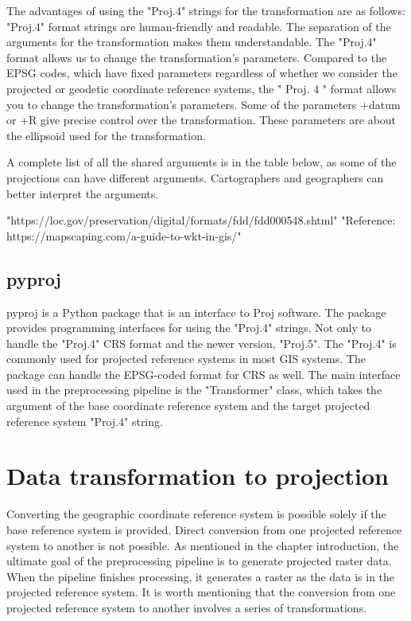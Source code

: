 The advantages of using the "Proj.4" strings for the transformation are as follows:
"Proj.4" format strings are human-friendly and readable. The separation of the arguments for the transformation makes them understandable.
The "Proj.4" format allows us to change the transformation's parameters. Compared to the EPSG codes, which have fixed parameters regardless of whether we consider the projected or geodetic coordinate reference systems, the " Proj. 4 " format allows you to change the transformation's parameters.
Some of the parameters +datum or +R give precise control over the transformation. These parameters are about the ellipsoid used for the transformation.

A complete list of all the shared arguments is in the table below, as some of the projections can have different arguments. Cartographers and geographers can better interpret the arguments.

"https://loc.gov/preservation/digital/formats/fdd/fdd000548.shtml"
"Reference: https://mapscaping.com/a-guide-to-wkt-in-gis/"
\subsection{pyproj}
pyproj is a Python package that is an interface to Proj software. The package provides programming interfaces for using the "Proj.4" strings. Not only to handle the "Proj.4"  CRS format and the newer version, "Proj.5". The "Proj.4" is commonly used for projected reference systems in most GIS systems. The package can handle the EPSG-coded format for CRS as well. The main interface used in the preprocessing pipeline is the "Transformer" class, which takes the argument of the base coordinate reference system and the target projected reference system "Proj.4" string.

\section{Data transformation to projection}
Converting the geographic coordinate reference system is possible solely if the base reference system is provided. Direct conversion from one projected reference system to another is not possible. As mentioned in the chapter introduction, the ultimate goal of the preprocessing pipeline is to generate projected raster data. When the pipeline finishes processing, it generates a raster as the data is in the projected reference system.
It is worth mentioning that the conversion from one projected reference system to another involves a series of transformations.

